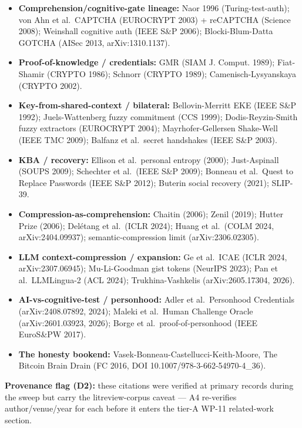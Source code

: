 \documentclass[
  11pt,
]{article}
\providecommand{\tightlist}{%
  \setlength{\itemsep}{0pt}\setlength{\parskip}{0pt}}
\begin{document}
\begin{itemize}
\tightlist
\item
  \textbf{Comprehension/cognitive-gate lineage:} Naor 1996
  (Turing-test-auth); von Ahn et al.~CAPTCHA (EUROCRYPT 2003) +
  reCAPTCHA (Science 2008); Weinshall cognitive auth (IEEE S\&P 2006);
  Blocki-Blum-Datta GOTCHA (AISec 2013, arXiv:1310.1137).
\item
  \textbf{Proof-of-knowledge / credentials:} GMR (SIAM J. Comput. 1989);
  Fiat-Shamir (CRYPTO 1986); Schnorr (CRYPTO 1989);
  Camenisch-Lysyanskaya (CRYPTO 2002).
\item
  \textbf{Key-from-shared-context / bilateral:} Bellovin-Merritt EKE
  (IEEE S\&P 1992); Juels-Wattenberg fuzzy commitment (CCS 1999);
  Dodis-Reyzin-Smith fuzzy extractors (EUROCRYPT 2004);
  Mayrhofer-Gellersen Shake-Well (IEEE TMC 2009); Balfanz et al.~secret
  handshakes (IEEE S\&P 2003).
\item
  \textbf{KBA / recovery:} Ellison et al.~personal entropy (2000);
  Just-Aspinall (SOUPS 2009); Schechter et al.~(IEEE S\&P 2009); Bonneau
  et al.~Quest to Replace Passwords (IEEE S\&P 2012); Buterin social
  recovery (2021); SLIP-39.
\item
  \textbf{Compression-as-comprehension:} Chaitin (2006); Zenil (2019);
  Hutter Prize (2006); Delétang et al.~(ICLR 2024); Huang et al.~(COLM
  2024, arXiv:2404.09937); semantic-compression limit
  (arXiv:2306.02305).
\item
  \textbf{LLM context-compression / expansion:} Ge et al.~ICAE (ICLR
  2024, arXiv:2307.06945); Mu-Li-Goodman gist tokens (NeurIPS 2023); Pan
  et al.~LLMLingua-2 (ACL 2024); Trukhina-Vashkelis (arXiv:2605.17304,
  2026).
\item
  \textbf{AI-vs-cognitive-test / personhood:} Adler et al.~Personhood
  Credentials (arXiv:2408.07892, 2024); Maleki et al.~Human Challenge
  Oracle (arXiv:2601.03923, 2026); Borge et al.~proof-of-personhood
  (IEEE EuroS\&PW 2017).
\item
  \textbf{The honesty bookend:} Vasek-Bonneau-Castellucci-Keith-Moore,
  The Bitcoin Brain Drain (FC 2016, DOI 10.1007/978-3-662-54970-4\_36).
\end{itemize}

\textbf{Provenance flag (D2):} these citations were verified at primary
records during the sweep but carry the litreview-corpus caveat --- A4
re-verifies author/venue/year for each before it enters the tier-A WP-11
related-work section.
\end{document}

